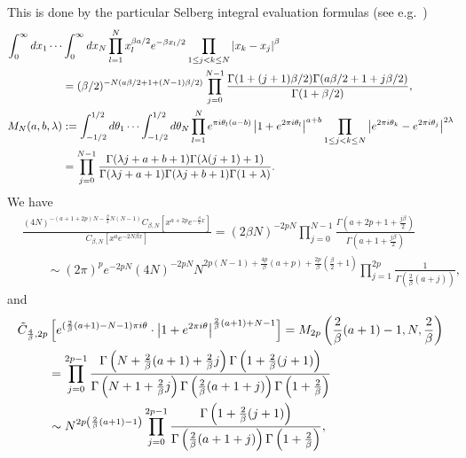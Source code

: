 \documentclass[11pt,a4paper]{article}
\numberwithin{equation}{section} %
\theoremstyle{plain}
\theoremstyle{definition}
\numberwithin{prop}{section}
\numberwithin{cor}{section}
\numberwithin{remark}{section}
\begin{document}
This is done by the particular Selberg integral evaluation formulas 
(see e.g.~\cite[\S 4.7]{Fo10})
\begin{align}
\int_0^{\infty} d x_1 \cdots &\int_0^{\infty} d x_N \prod_{l=1}^N x_l^{\beta a / 2} e^{-\beta x_l / 2} \prod_{1 \leq j<k \leq N}\left|x_k-x_j\right|^\beta \notag\\
&=(\beta / 2)^{-N(a \beta / 2+1+(N-1) \beta / 2)} \prod_{j=0}^{N-1} \frac{\Gamma(1+(j+1) \beta / 2) \Gamma(a \beta / 2+1+j \beta / 2)}{\Gamma(1+\beta / 2)} , \label{sel-int1}\\
M_N(a, b, \lambda) & :=\int_{-1 / 2}^{1 / 2} d \theta_1 \cdots \int_{-1 / 2}^{1 / 2} d \theta_N \prod_{l=1}^N e^{\pi i \theta_l(a-b)}\left|1+e^{2 \pi i \theta_l}\right|^{a+b} \prod_{1 \leq j<k \leq N}\left|e^{2 \pi i \theta_k}-e^{2 \pi i \theta_j}\right|^{2 \lambda} \notag\\
& =\prod_{j=0}^{N-1} \frac{\Gamma(\lambda j+a+b+1) \Gamma(\lambda(j+1)+1)}{\Gamma(\lambda j+a+1) \Gamma(\lambda j+b+1) \Gamma(1+\lambda)}. \label{sel-int-2}
\end{align}
We have 
\begin{align*}
    &\frac{(4 N)^{-(a+1+2 p) N-\frac{\beta}{2} N(N-1)}  C_{\beta, N}\left[x^{a+2 p} e^{-\frac{\beta}{2} x}\right]}{C_{\beta, N}\left[x^a e^{-2 N \beta x}\right]}=\left(2\beta N\right)^{-2 p N}  \prod_{j=0}^{N-1} \frac{\Gamma\left(a+2 p+1+\frac{j \beta}{2}\right)}{\Gamma\left(a+1+\frac{j \beta}{2}\right)}\nonumber\\
    &\qquad\sim (2 \pi)^p e^{-2 p N} (4 N)^{-2 p N}  N^{2 p(N-1)+\frac{4 p}{\beta}(a+p)+\frac{2 p}{\beta}\left(\frac{\beta}{2}+1\right)}  \prod_{j=1}^{2p}\frac{1}{\Gamma\left(\frac{2}{\beta}(a+j)\right)}, 
\end{align*}
and 
\begin{align*}
    \tilde{C}_{{4\over\beta}, 2 p}&\left[e^{(\frac{2}{\beta}(a+1)-N-1) \pi i \theta} \cdot\left|1+e^{2 \pi i \theta}\right|^{\frac{2}{\beta}(a+1)+N-1}\right]=M_{2 p}\left(\frac{2}{\beta}(a+1)-1, N, \frac{2}{\beta}\right)\nonumber\\
    &=\prod_{j=0}^{2 p-1} \frac{\Gamma\left(N+\frac{2}{\beta}(a+1)+\frac{2}{\beta} j\right) \Gamma\left(1+\frac{2}{\beta}(j+1)\right)}{\Gamma\left(N+1+\frac{2}{\beta} j\right) \Gamma\left(\frac{2}{\beta}(a+1+j)\right) \Gamma\left(1+\frac{2}{\beta}\right)}\nonumber\\
    &\sim N^{2 p\left(\frac{2}{\beta}(a+1)-1\right)}\prod_{j=0}^{2 p-1} \frac{\Gamma\left(1+\frac{2}{\beta}(j+1)\right)}{\Gamma\left(\frac{2}{\beta}(a+1+j)\right) \Gamma\left(1+\frac{2}{\beta}\right)} ,
\end{align*}
\end{document}
